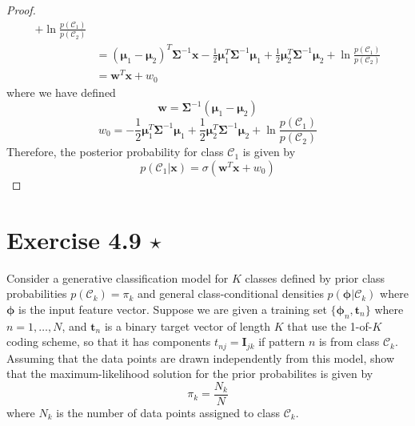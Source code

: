 \begin{proof}
\begin{align*}
        + \ln \frac{p(\mathcal{C}_1)}{p(\mathcal{C}_2)}\\
        &= (\bm{\mu}_1 - \bm{\mu}_2)^T \mathbf{\Sigma}^{-1} \mathbf{x}
        - \frac{1}{2} \bm{\mu}_1^T\mathbf{\Sigma}^{-1}\bm{\mu}_1
        + \frac{1}{2} \bm{\mu}_2^T\mathbf{\Sigma}^{-1}\bm{\mu}_2
        + \ln \frac{p(\mathcal{C}_1)}{p(\mathcal{C}_2)}\\
        &= \mathbf{w}^T\mathbf{x} + w_0
    \end{align*}
    where we have defined 
    \begin{equation}\label{eq:4.66}\tag{4.66}
        \mathbf{w} = \mathbf{\Sigma}^{-1}(\bm{\mu}_1 - \bm{\mu}_2)
    \end{equation}
    \vspace{-1em}
    \begin{equation}\label{eq:4.67}\tag{4.67}
        w_0 = 
        - \frac{1}{2} \bm{\mu}_1^T\mathbf{\Sigma}^{-1}\bm{\mu}_1
        + \frac{1}{2} \bm{\mu}_2^T\mathbf{\Sigma}^{-1}\bm{\mu}_2
        + \ln \frac{p(\mathcal{C}_1)}{p(\mathcal{C}_2)}
    \end{equation}
    Therefore, the posterior probability for class $\mathcal{C}_1$ 
    is given by
    \begin{equation}\label{eq:4.65}\tag{4.65}
        p(\mathcal{C}_1 | \mathbf{x}) = \sigma(\mathbf{w}^T\mathbf{x} + w_0)
    \end{equation}
\end{proof}

\section*{Exercise 4.9 $\star$}
Consider a generative classification model for $K$ classes
defined by prior class probabilities $p(\mathcal{C}_k) = \pi_k$
and general class-conditional densities  $p(\bm{\phi} | \mathcal{C}_k)$
where $\mathbf{\phi}$ is the input feature vector. Suppose
we are given a training set $\{\bm{\phi}_n, \mathbf{t}_n\}$ where
$n = 1,\ldots, N$, and $\mathbf{t}_n$ is a binary target vector
of length $K$ that use the 1-of-$K$ coding scheme, so
that it has components $t_{nj} = \mathbf{I}_{jk}$ if pattern
$n$ is from class $\mathcal{C}_k$. Assuming that the data points
are drawn independently from this model, show that the 
maximum-likelihood solution for the prior probabilites is given
by 
\begin{equation}\label{eq:4.159}\tag{4.159}
    \pi_k = \frac{N_k}{N}
\end{equation}
where $N_k$ is the number of data points assigned to class 
$\mathcal{C}_k$.

